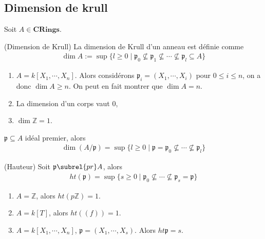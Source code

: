         \subsection{Dimension de krull}
            Soit $A \in \mathbf{CRings}$.
            \begin{defi} (Dimension de Krull) La dimension de Krull d'un anneau est définie comme
                \begin{align*}
                    \dim A := \sup \{l \geq 0 \mid \mathfrak{p}_0 \nsubseteq \mathfrak{p}_1 \nsubseteq \cdots \nsubseteq \mathfrak{p}_l \subseteq A\}
                \end{align*}
            \end{defi}
            \begin{expl}
                \begin{enumerate}
                    \item $A = k[X_1, \cdots, X_n]$. Alors considérons $\mathfrak{p}_i = (X_1, \cdots, X_i)$ pour $0 \leq i \leq n$, on a donc $\dim A \geq n$. On peut en fait montrer que $\dim A = n$. 
                    \item La dimension d'un corps vaut $0$,
                    \item $\dim \mathbb{Z} = 1$.
                \end{enumerate}
            \end{expl}
            \begin{remq}
                $\mathfrak{p} \subseteq A$ idéal premier, alors
                \begin{align*}
                    \dim (A/\mathfrak{p}) = \sup \{l \geq 0 \mid \mathfrak{p} = \mathfrak{p}_0 \nsubseteq \cdots \nsubseteq \mathfrak{p}_l \}
                \end{align*}
            \end{remq}
            \begin{defi} (Hauteur)
                Soit $\mathfrak{p} \subrel{pr} A$, alors
                \begin{align*}
                    ht(\mathfrak{p}) = \sup \{s \geq 0 \mid \mathfrak{p}_0 \nsubseteq \cdots \nsubseteq \mathfrak{p}_s = \mathfrak{p} \}
                \end{align*}
            \end{defi}
            \begin{expl}
                \begin{enumerate}
                    \item $A = \mathbb{Z}$, alors $ht(p \mathbb{Z}) = 1$. 
                    \item $A = k[T]$, alors $ht((f)) = 1$.
                    \item $A = k[X_1, \cdots, X_n]$, $\mathfrak{p} = (X_1, \cdots, X_s)$. Alors $ht \mathfrak{p} = s$.
                \end{enumerate}
            \end{expl}
